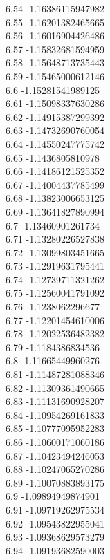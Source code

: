 {6.54	-1.16386115947982\\
6.55	-1.16201382465665\\
6.56	-1.16016904426486\\
6.57	-1.15832681594959\\
6.58	-1.15648713735443\\
6.59	-1.15465000612146\\
6.6	-1.15281541989125\\
6.61	-1.15098337630286\\
6.62	-1.14915387299392\\
6.63	-1.14732690760054\\
6.64	-1.14550247775742\\
6.65	-1.1436805810978\\
6.66	-1.14186121525352\\
6.67	-1.14004437785499\\
6.68	-1.13823006653125\\
6.69	-1.13641827890994\\
6.7	-1.13460901261734\\
6.71	-1.13280226527838\\
6.72	-1.13099803451665\\
6.73	-1.12919631795441\\
6.74	-1.12739711321262\\
6.75	-1.12560041791092\\
6.76	-1.1238062296677\\
6.77	-1.12201454610006\\
6.78	-1.12022536482382\\
6.79	-1.1184386834536\\
6.8	-1.11665449960276\\
6.81	-1.11487281088346\\
6.82	-1.11309361490665\\
6.83	-1.11131690928207\\
6.84	-1.10954269161833\\
6.85	-1.10777095952283\\
6.86	-1.10600171060186\\
6.87	-1.10423494246053\\
6.88	-1.10247065270286\\
6.89	-1.10070883893175\\
6.9	-1.09894949874901\\
6.91	-1.09719262975534\\
6.92	-1.09543822955041\\
6.93	-1.09368629573279\\
6.94	-1.09193682590003\\
}
